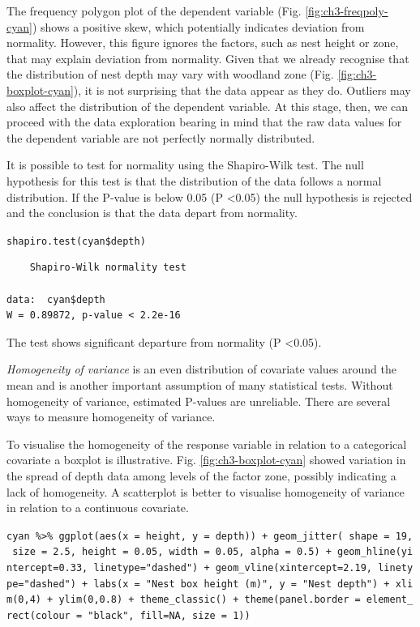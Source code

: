 \documentclass[
]{book}
\begin{document}
The frequency polygon plot of the dependent variable (Fig. \ref{fig:ch3-freqpoly-cyan}) shows a positive skew, which potentially indicates deviation from normality. However, this figure ignores the factors, such as nest height or zone, that may explain deviation from normality. Given that we already recognise that the distribution of nest depth may vary with woodland zone (Fig. \ref{fig:ch3-boxplot-cyan}), it is not surprising that the data appear as they do. Outliers may also affect the distribution of the dependent variable. At this stage, then, we can proceed with the data exploration bearing in mind that the raw data values for the dependent variable are not perfectly normally distributed.

It is possible to test for normality using the Shapiro-Wilk test. The null hypothesis for this test is that the distribution of the data follows a normal distribution. If the P-value is below 0.05 (P \textless0.05) the null hypothesis is rejected and the conclusion is that the data depart from normality.

\texttt{shapiro.test(cyan\$depth)}

\begin{verbatim}
    Shapiro-Wilk normality test

data:  cyan$depth
W = 0.89872, p-value < 2.2e-16
\end{verbatim}

The test shows significant departure from normality (P \textless0.05).

\emph{Homogeneity of variance} is an even distribution of covariate values around the mean and is another important assumption of many statistical tests. Without homogeneity of variance, estimated P-values are unreliable. There are several ways to measure homogeneity of variance.

To visualise the homogeneity of the response variable in relation to a categorical covariate a boxplot is illustrative. Fig. \ref{fig:ch3-boxplot-cyan} showed variation in the spread of depth data among levels of the factor zone, possibly indicating a lack of homogeneity. A scatterplot is better to visualise homogeneity of variance in relation to a continuous covariate.

\texttt{cyan\ \%\textgreater{}\%\ ggplot(aes(x\ =\ height,\ y\ =\ depth))\ +\ geom\_jitter(\ shape\ =\ 19,\ size\ =\ 2.5,\ height\ =\ 0.05,\ width\ =\ 0.05,\ alpha\ =\ 0.5)\ +\ geom\_hline(yintercept=0.33,\ linetype="dashed")\ +\ geom\_vline(xintercept=2.19,\ linetype="dashed")\ +\ labs(x\ =\ "Nest\ box\ height\ (m)",\ y\ =\ "Nest\ depth")\ +\ xlim(0,4)\ +\ ylim(0,0.8)\ +\ theme\_classic()\ +\ theme(panel.border\ =\ element\_rect(colour\ =\ "black",\ fill=NA,\ size\ =\ 1))}
\end{document}
